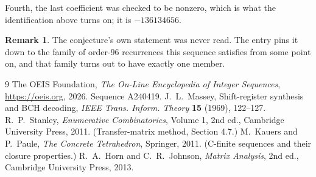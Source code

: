 \documentclass[11pt,a4paper]{article}
\theoremstyle{plain}
\theoremstyle{definition}
\newtheorem{remark}[theorem]{Remark}
\begin{document}
Fourth, the last coefficient was checked to be nonzero, which is what the identification above
turns on; it is $-136134656$.

\begin{remark}
The conjecture's own statement was never read. The entry pins it down to the family of
order-$96$ recurrences this sequence satisfies from some point on, and that family turns
out to have exactly one member.
\end{remark}

\begin{thebibliography}{9}
 The OEIS Foundation, \emph{The On-Line Encyclopedia of Integer
Sequences}, \url{https://oeis.org}, 2026. Sequence A240419.
 J.~L.~Massey, Shift-register synthesis and BCH decoding, \emph{IEEE
Trans. Inform. Theory} \textbf{15} (1969), 122--127.
 R.~P.~Stanley, \emph{Enumerative Combinatorics}, Volume 1, 2nd ed.,
Cambridge University Press, 2011. (Transfer-matrix method, Section 4.7.)
 M.~Kauers and P.~Paule, \emph{The Concrete Tetrahedron}, Springer, 2011.
(C-finite sequences and their closure properties.)
 R.~A.~Horn and C.~R.~Johnson, \emph{Matrix Analysis}, 2nd ed., Cambridge
University Press, 2013.
\end{thebibliography}
\end{document}
